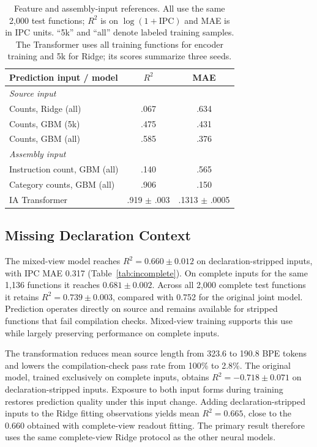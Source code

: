 \documentclass[conference]{IEEEtran}
\newcommand{\new}[1]{{#1}}
\newenvironment{newtext}{\begingroup}{\endgroup}
\newcommand{\Rsq}{R^{2}}
\begin{document}
\begin{table}[t]
\begin{newtext}
\caption{\new{Feature and assembly-input references. All use the same 2,000 test functions; $\Rsq$ is on $\log(1+\mathrm{IPC})$ and MAE is in IPC units. ``5k'' and ``all'' denote labeled training samples. The Transformer uses all training functions for encoder training and 5k for Ridge; its scores summarize three seeds.}}
\label{tab:reference}
\centering\small
\setlength{\tabcolsep}{3pt}
\begin{tabular}{lcc}
\toprule
Prediction input / model & $\Rsq$ & MAE\\
\midrule
\multicolumn{3}{l}{\textit{Source input}}\\
Counts, Ridge (all) & .067 & .634\\
Counts, GBM (5k) & .475 & .431\\
Counts, GBM (all) & .585 & .376\\
\midrule
\multicolumn{3}{l}{\textit{Assembly input}}\\
Instruction count, GBM (all) & .140 & .565\\
Category counts, GBM (all) & .906 & .150\\
IA Transformer & .919 $\pm$ .003 & .1313 $\pm$ .0005\\
\bottomrule
\end{tabular}
\end{newtext}
\end{table}

\begin{newtext}
\subsection{Missing Declaration Context}
The mixed-view model reaches $\Rsq=0.660\pm0.012$ on declaration-stripped inputs, with IPC MAE 0.317 (Table~\ref{tab:incomplete}). On complete inputs for the same 1,136 functions it reaches $0.681\pm0.002$. Across all 2,000 complete test functions it retains $\Rsq=0.739\pm0.003$, compared with 0.752 for the original joint model. Prediction operates directly on source and remains available for stripped functions that fail compilation checks. Mixed-view training supports this use while largely preserving performance on complete inputs.

The transformation reduces mean source length from 323.6 to 190.8 BPE tokens and lowers the compilation-check pass rate from 100\% to 2.8\%. The original model, trained exclusively on complete inputs, obtains $\Rsq=-0.718\pm0.071$ on declaration-stripped inputs. Exposure to both input forms during training restores prediction quality under this input change. Adding declaration-stripped inputs to the Ridge fitting observations yields mean $\Rsq=0.665$, close to the 0.660 obtained with complete-view readout fitting. The primary result therefore uses the same complete-view Ridge protocol as the other neural models.

\end{newtext}
\end{document}
